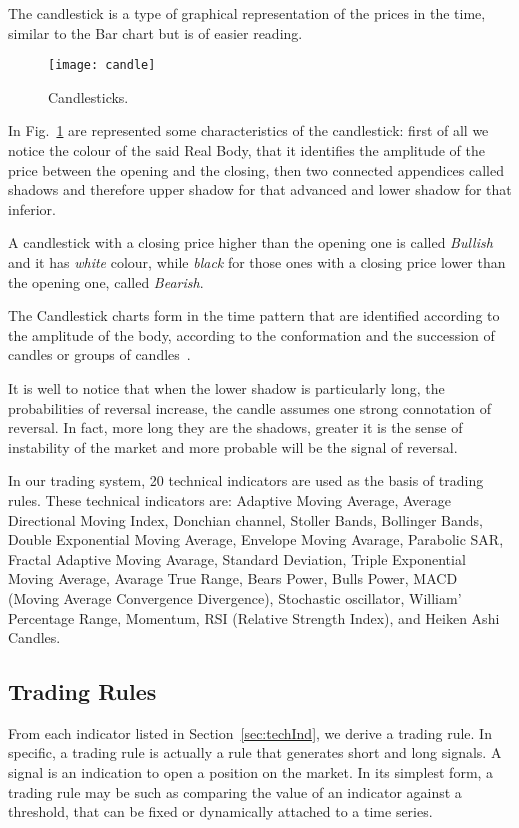 The candlestick is a type of graphical representation of the prices in the time, similar to the Bar chart but is of easier reading.

\begin{figure}[h]
\texttt{[image: candle]}
\centering
\caption{Candlesticks.}
\label{fig:candle} 
\end{figure}

In Fig.~\ref{fig:candle} are represented some characteristics of the candlestick: first of all we notice the colour of the said Real Body, that it identifies the amplitude of the price between the opening and the closing, then two connected appendices called shadows and therefore upper shadow for that advanced and lower shadow for that inferior.

A candlestick with a closing price higher than the opening one is called \textit{Bullish} and it has \textit{white} colour, while \textit{black} for those ones with a closing price lower than the opening one, called \textit{Bearish}.

The Candlestick charts form in the time pattern that are identified according to the amplitude of the body, according to the conformation and the succession of candles or groups of candles~\cite{OZTURK2016170}.

It is well to notice that when the lower shadow is particularly long, the probabilities of reversal increase, the candle assumes one strong connotation of reversal. In fact, more long they are the shadows, greater it is the sense of instability of the market and more probable will be the signal of reversal.


In our trading system, 20 technical indicators are used as the basis of trading rules. These technical indicators are: Adaptive Moving Average, Average Directional Moving Index, Donchian channel, Stoller Bands, Bollinger Bands, Double Exponential Moving Average, Envelope Moving Avarage, Parabolic SAR, Fractal Adaptive Moving Avarage, Standard Deviation, Triple Exponential Moving Average, Avarage True Range, Bears Power, Bulls Power, MACD (Moving Average Convergence Divergence), Stochastic oscillator, William' Percentage Range, Momentum, RSI (Relative Strength Index), and Heiken Ashi Candles.

\subsection{Trading Rules}
From each indicator listed in Section~\ref{sec:techInd}, we derive a trading rule. In specific, a trading rule is actually a rule that generates short and long signals. A signal is an indication to open a position on the market. In its simplest form, a trading rule may be such as comparing the value of an indicator against a threshold, that can be fixed or dynamically attached to a time series.

